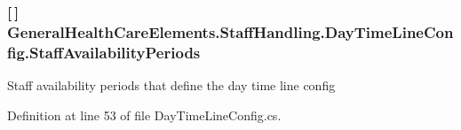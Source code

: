 \subsubsection[{\texorpdfstring{Staff\+Availability\+Periods}{StaffAvailabilityPeriods}}]{ \mbox{[}$\,$\mbox{]} General\+Health\+Care\+Elements.\+Staff\+Handling.\+Day\+Time\+Line\+Config.\+Staff\+Availability\+Periods\hspace{0.3cm}{\ttfamily [get]}}\hypertarget{class_general_health_care_elements_1_1_staff_handling_1_1_day_time_line_config_af2745ebb9e1b89c086be4cf717c1c3d5}{}\label{class_general_health_care_elements_1_1_staff_handling_1_1_day_time_line_config_af2745ebb9e1b89c086be4cf717c1c3d5}


Staff availability periods that define the day time line config 



Definition at line 53 of file Day\+Time\+Line\+Config.\+cs.

